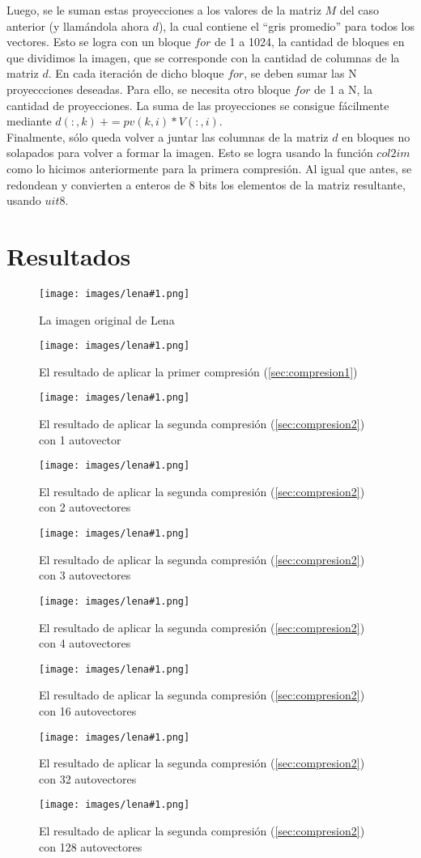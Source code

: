 \documentclass[twocolumn,a4paper,10pt]{article}
\begin{document}
Luego, se le suman estas proyecciones a los valores de la matriz $M$ del caso anterior (y llam\'andola ahora $d$), la cual contiene el ``gris promedio'' para todos 
los vectores. Esto se logra con un bloque $for$ de 1 a 1024, la cantidad de bloques en que dividimos la imagen, que se corresponde con la cantidad de columnas 
de la matriz $d$. En cada iteración de dicho bloque $for$, se deben sumar las N proyeccciones deseadas. Para ello, se necesita otro bloque $for$ de 1 a N, la cantidad 
de proyecciones. La suma de las proyecciones se consigue f\'acilmente mediante $d(:,k)\: += pv(k,i) * V(:,i)$. \\

Finalmente, s\'olo queda volver a juntar las columnas de la matriz $d$ en bloques no solapados para volver a formar la imagen. Esto se logra usando la funci\'on 
$col2im$ como lo hicimos anteriormente para la primera compresi\'on. Al igual que antes, se redondean y convierten a enteros de 8 bits los elementos de la matriz
resultante, usando $uit8$.\\

\section{Resultados}

\newcommand{\lena}[2]{
    \begin{figure}[H]
        \label{lena#1}
        \texttt{[image: images/lena\#1.png]}
        \caption{#2}
    \end{figure}
}

\lena{512}{La imagen original de Lena}

\lena{-bruta}{El resultado de aplicar la primer compresi\'on (\ref{sec:compresion1})}

\lena{-eig-1}{El resultado de aplicar la segunda compresi\'on (\ref{sec:compresion2}) con 1 autovector}
\lena{-eig-2}{El resultado de aplicar la segunda compresi\'on (\ref{sec:compresion2}) con 2 autovectores}
\lena{-eig-3}{El resultado de aplicar la segunda compresi\'on (\ref{sec:compresion2}) con 3 autovectores}
\lena{-eig-4}{El resultado de aplicar la segunda compresi\'on (\ref{sec:compresion2}) con 4 autovectores}
\lena{-eig-16}{El resultado de aplicar la segunda compresi\'on (\ref{sec:compresion2}) con 16 autovectores}
\lena{-eig-32}{El resultado de aplicar la segunda compresi\'on (\ref{sec:compresion2}) con 32 autovectores}
\lena{-eig-128}{El resultado de aplicar la segunda compresi\'on (\ref{sec:compresion2}) con 128 autovectores}
\end{document}
